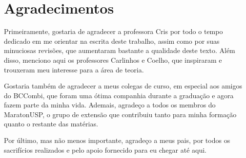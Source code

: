 



\chapter*{Agradecimentos}

Primeiramente, gostaria de agradecer a professora Cris por todo o tempo dedicado em me orientar na escrita deste trabalho, assim como por suas minuciosas revisões, que aumentaram bastante a qualidade deste texto. Além disso, menciono aqui os professores Carlinhos e Coelho, que inspiraram e trouxeram meu interesse para a área de teoria.

Gostaria também de agradecer a meus colegas de curso, em especial aos amigos do BCCombi, que foram uma ótima companhia durante a graduação e agora fazem parte da minha vida. Ademais, agradeço a todos os membros do MaratonUSP, o grupo de extensão que contribuiu tanto para minha formação quanto o restante das matérias.

Por último, mas não menos importante, agradeço a meus pais, por todos os sacrifícios realizados e pelo apoio fornecido para eu chegar até aqui.

\printResumoAbstract



